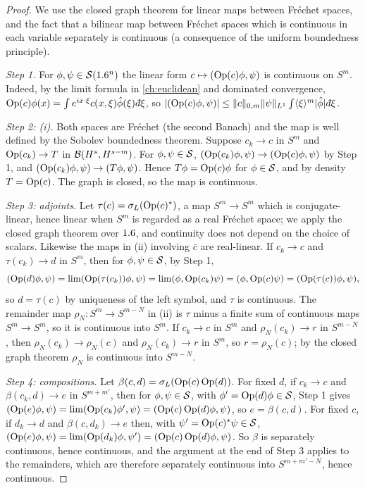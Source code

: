 \begin{proof}
  We use the closed graph theorem for linear maps between Fréchet spaces, and
  the fact that a bilinear map between Fréchet spaces which is continuous in
  each variable separately is continuous (a consequence of the uniform
  boundedness principle).

  \emph{Step 1.} For $\phi,\psi\in\mathcal{S}(1.6^n)$ the linear form
  $c\mapsto( \operatorname{Op}(c)\phi, \psi)$ is continuous on $S^m$. Indeed, by the limit
  formula in \cref{ch:euclidean} and dominated convergence,
  $\Op(c)\phi(x)=\int e^{ix\cdot\xi}c(x,\xi)\hat\phi(\xi)\,\dbar\xi$, so
  $\abs{\inner{\Op(c)\phi}\psi}\le\norm c_{0,m}\norm\psi_{L^1}
  \int\ang\xi^m\abs{\hat\phi}\,\dbar\xi$.

  \emph{Step 2: (i).} Both spaces are Fréchet (the second Banach) and the map is
  well defined by the Sobolev boundedness theorem. Suppose $c_k\to c$ in $S^m$
  and $\operatorname{Op}(c_k)\to T$ in $\mathcal{B}(H^s,H^{s-m})$. For $\phi,\psi\in\mathcal{S}$,
  $( \operatorname{Op}(c_k)\phi, \psi)\to( \operatorname{Op}(c)\phi, \psi)$ by Step 1, and
  $( \operatorname{Op}(c_k)\phi, \psi)\to( T\phi, \psi)$. Hence $T\phi=\operatorname{Op}(c)\phi$ for
  $\phi\in\mathcal{S}$, and by density $T=\operatorname{Op}(c)$. The graph is closed, so the map is
  continuous.

  \emph{Step 3: adjoints.} Let $\tau(c)=\sigma_L(\operatorname{Op}(c)^*)$, a map
  $S^m\to S^m$ which is conjugate-linear, hence linear when $S^m$ is regarded
  as a real Fréchet space; we apply the closed graph theorem over $1.6$, and
  continuity does not depend on the choice of scalars. Likewise the maps in
  (ii) involving $\bar c$ are real-linear. If $c_k\to c$ and $\tau(c_k)\to d$ in $S^m$, then for
  $\phi,\psi\in\mathcal{S}$, by Step 1,
  \begin{equation*}
    ( \operatorname{Op}(d)\phi, \psi)=\lim( \operatorname{Op}(\tau(c_k))\phi, \psi)
    =\lim( \phi, \operatorname{Op}(c_k)\psi)=( \phi, \operatorname{Op}(c)\psi)=( \operatorname{Op}(\tau(c))\phi, \psi),
  \end{equation*}
  so $d=\tau(c)$ by uniqueness of the left symbol, and $\tau$ is continuous.
  The remainder map $\rho_N:S^m\to S^{m-N}$ in (ii) is $\tau$ minus a finite sum
  of continuous maps $S^m\to S^m$, so it is continuous into $S^m$. If $c_k\to c$
  in $S^m$ and $\rho_N(c_k)\to r$ in $S^{m-N}$, then $\rho_N(c_k)\to\rho_N(c)$
  and $\rho_N(c_k)\to r$ in $S^m$, so $r=\rho_N(c)$; by the closed graph theorem
  $\rho_N$ is continuous into $S^{m-N}$.

  \emph{Step 4: compositions.} Let $\beta(c,d)=\sigma_L(\operatorname{Op}(c)\operatorname{Op}(d))$. For fixed
  $d$, if $c_k\to c$ and $\beta(c_k,d)\to e$ in $S^{m+m'}$, then for
  $\phi,\psi\in\mathcal{S}$, with $\phi'=\operatorname{Op}(d)\phi\in\mathcal{S}$, Step 1 gives
  $( \operatorname{Op}(e)\phi, \psi)=\lim( \operatorname{Op}(c_k)\phi', \psi)=( \operatorname{Op}(c)\operatorname{Op}(d)\phi, \psi)$,
  so $e=\beta(c,d)$. For fixed $c$, if $d_k\to d$ and $\beta(c,d_k)\to e$ then,
  with $\psi'=\operatorname{Op}(c)^*\psi\in\mathcal{S}$,
  $( \operatorname{Op}(e)\phi, \psi)=\lim( \operatorname{Op}(d_k)\phi, \psi')=( \operatorname{Op}(c)\operatorname{Op}(d)\phi, \psi)$.
  So $\beta$ is separately continuous, hence continuous, and the argument at
  the end of Step 3 applies to the remainders, which are therefore separately
  continuous into $S^{m+m'-N}$, hence continuous.


\end{proof}
